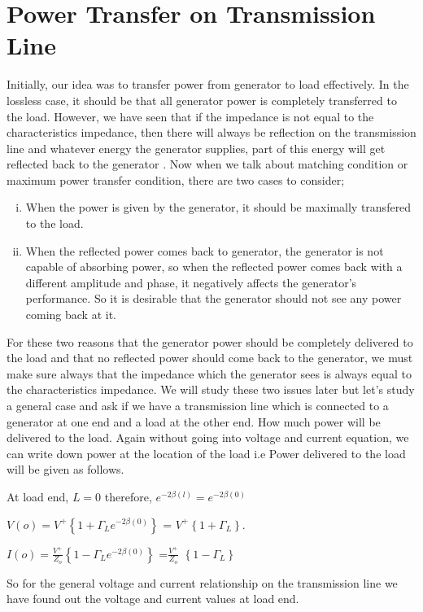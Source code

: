 \section{Power Transfer on Transmission Line}
Initially, our idea was to transfer power from generator to load effectively. In the lossless case, it should be that all generator power is completely transferred to the load. However, we have seen that if the impedance is not equal to the characteristics impedance, then there will always be reflection on the transmission line and whatever energy the generator supplies, part of this energy will get reflected back to the generator . Now when we talk about matching condition or maximum power transfer condition, there are two cases to consider;
\begin{enumerate}[(i)]
\item When the power is given by the generator, it should be maximally transfered to the load.
\item When the reflected power comes back to generator, the generator is not capable of absorbing power, so when the reflected power comes back with a different amplitude and phase, it negatively affects the generator's performance. So it is desirable that the generator should not see any power coming back at it.
\end{enumerate}
For these two reasons that the generator power should be completely delivered to the load and that no reflected power should come back to the generator, we must make sure always that the impedance which the generator sees is always equal to the characteristics impedance. We will study these two issues later but let's study a general case and ask if we have a transmission line which is connected to a generator at  one end and a load at the other end. How much power will be delivered to the load. Again without going into voltage and current equation, we can write down power at the location of the load i.e Power delivered to the load will be given as follows.

At load end, $L=0$ therefore, $e^{-2\beta (l)} = e^{-2\beta (0)}$

$V(o)= V^{+} \left\lbrace {1 + \Gamma_L e^{-2\beta(0)}}\right\rbrace $ = $V^{+}\left\lbrace 1 +\Gamma_L \right\rbrace$.

$I(o)= \frac{V^{+}}{Z_o} \left\lbrace {1 - \Gamma_L e^{-2\beta(0)}}\right\rbrace $ =$ \frac{V^{+}}{Z_o}$ $\left\lbrace 1 -\Gamma_L \right\rbrace$ 

So for the general voltage and current relationship on the transmission line we have found  out the voltage and current values at load end.

